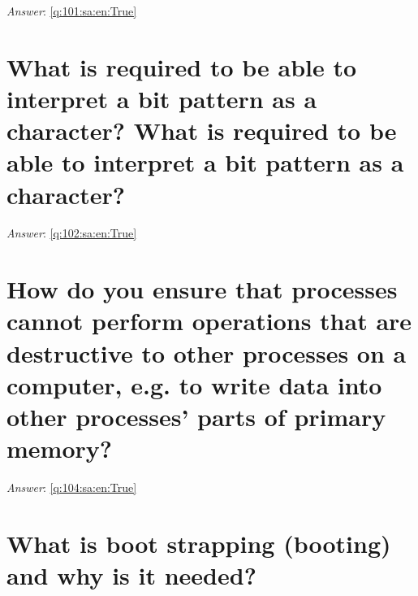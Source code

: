 \documentclass[a4paper,11pt,oneside]{book}
\begin{document}
\begin{sloppypar}
\label{q:101:sa:en:False}

\vspace{2cm}

\noindent\makebox[\textwidth]{\hrulefill}

\vspace{1cm}

\textit{Answer}: \autoref{q:101:sa:en:True}



\section{What is required to be able to interpret a bit pattern as a character? What is required to be able to interpret a bit pattern as a character?}

\label{q:102:sa:en:False}

\vspace{2cm}

\noindent\makebox[\textwidth]{\hrulefill}

\vspace{1cm}

\textit{Answer}: \autoref{q:102:sa:en:True}



\section{How do you ensure that processes cannot perform operations that are destructive to other processes on a computer, e.g. to write data into other processes' parts of primary memory?}

\label{q:104:sa:en:False}

\vspace{2cm}

\noindent\makebox[\textwidth]{\hrulefill}

\vspace{1cm}

\textit{Answer}: \autoref{q:104:sa:en:True}



\section{What is boot strapping (booting) and why is it needed?}

\label{q:105:sa:en:False}

\vspace{2cm}

\noindent\makebox[\textwidth]{\hrulefill}


\end{sloppypar}
\end{document}
